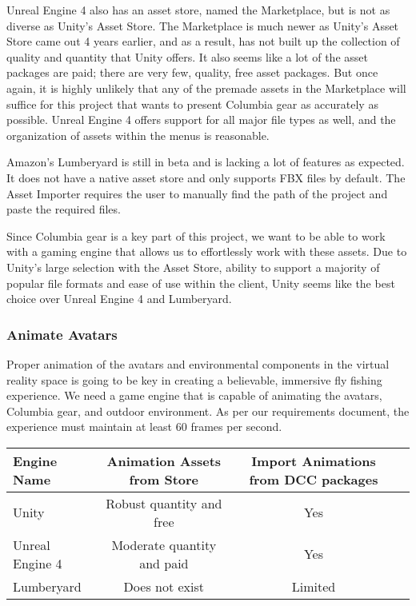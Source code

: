 \documentclass[10pt,journal,compsoc,onecolumn, draftclsnofoot]{IEEEtran}
\begin{document}
Unreal Engine 4 also has an asset store, named the Marketplace, but is not as diverse as Unity's Asset Store. The Marketplace is much newer\cite{unreal_marketplace_date} as Unity's Asset Store came out 4 years earlier, and as a result, has not built up the collection of quality and quantity that Unity offers. It also seems like a lot of the asset packages are paid; there are very few, quality, free asset packages. But once again, it is highly unlikely that any of the premade assets in the Marketplace will suffice for this project that wants to present Columbia gear as accurately as possible. Unreal Engine 4 offers support for all major file types as well, and the organization of assets within the menus is reasonable.

Amazon's Lumberyard is still in beta and is lacking a lot of features as expected. It does not have a native asset store and only supports FBX files by default. The Asset Importer requires the user to manually find the path of the project and paste the required files\cite{lumberyard_import}.

Since Columbia gear is a key part of this project, we want to be able to work with a gaming engine that allows us to effortlessly work with these assets. Due to Unity's large selection with the Asset Store, ability to support a majority of popular file formats and ease of use within the client, Unity seems like the best choice over Unreal Engine 4 and Lumberyard.

\subsubsection{Animate Avatars}
Proper animation of the avatars and environmental components in the virtual reality space is going to be key in creating a believable, immersive fly fishing experience. We need a game engine that is capable of animating the avatars, Columbia gear, and outdoor environment. As per our requirements document, the experience must maintain at least 60 frames per second.

\vspace{2mm}
\begin{table}[h!]
\centering
  \begin{tabular}{ | l || c | c | c | }
  \hline
  Engine Name & Animation Assets from Store & Import Animations from DCC packages\\
  \hline
  Unity & Robust quantity and free &  Yes\\ \hline
  Unreal Engine 4 & Moderate quantity and paid & Yes\\ \hline
  Lumberyard & Does not exist & Limited\\ \hline
  \end{tabular}
\end{table}
\vspace{2mm}
\end{document}
